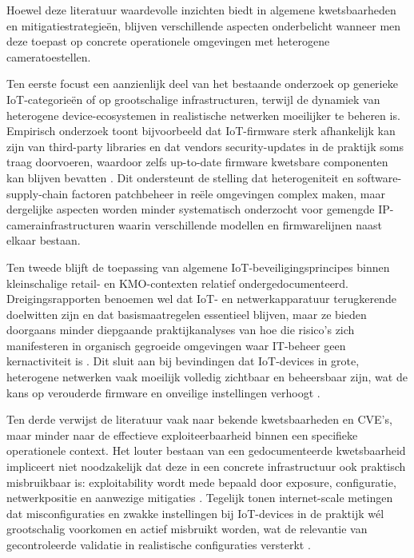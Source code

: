 Hoewel deze literatuur waardevolle inzichten biedt in algemene kwetsbaarheden en mitigatiestrategieën, blijven verschillende aspecten onderbelicht wanneer men deze toepast op concrete operationele omgevingen met heterogene cameratoestellen.

Ten eerste focust een aanzienlijk deel van het bestaande onderzoek op generieke IoT-categorieën of op grootschalige infrastructuren, terwijl de dynamiek van heterogene device-ecosystemen in realistische netwerken moeilijker te beheren is. Empirisch onderzoek toont bijvoorbeeld dat IoT-firmware sterk afhankelijk kan zijn van third-party libraries en dat vendors security-updates in de praktijk soms traag doorvoeren, waardoor zelfs up-to-date firmware kwetsbare componenten kan blijven bevatten \autocite{zhang2021capture}. Dit ondersteunt de stelling dat heterogeniteit en software-supply-chain factoren patchbeheer in reële omgevingen complex maken, maar dergelijke aspecten worden minder systematisch onderzocht voor gemengde IP-camerainfrastructuren waarin verschillende modellen en firmwarelijnen naast elkaar bestaan.

Ten tweede blijft de toepassing van algemene IoT-beveiligingsprincipes binnen kleinschalige retail- en KMO-contexten relatief ondergedocumenteerd. Dreigingsrapporten benoemen wel dat IoT- en netwerkapparatuur terugkerende doelwitten zijn en dat basismaatregelen essentieel blijven, maar ze bieden doorgaans minder diepgaande praktijkanalyses van hoe die risico’s zich manifesteren in organisch gegroeide omgevingen waar IT-beheer geen kernactiviteit is \autocite{ENISA2024ThreatLandscape}. Dit sluit aan bij bevindingen dat IoT-devices in grote, heterogene netwerken vaak moeilijk volledig zichtbaar en beheersbaar zijn, wat de kans op verouderde firmware en onveilige instellingen verhoogt \autocite{agarwal2019detecting}.

Ten derde verwijst de literatuur vaak naar bekende kwetsbaarheden en CVE’s, maar minder naar de effectieve exploiteerbaarheid binnen een specifieke operationele context. Het louter bestaan van een gedocumenteerde kwetsbaarheid impliceert niet noodzakelijk dat deze in een concrete infrastructuur ook praktisch misbruikbaar is: exploitability wordt mede bepaald door exposure, configuratie, netwerkpositie en aanwezige mitigaties \autocite{figueroa2020survey,baho2023analysis}. Tegelijk tonen internet-scale metingen dat misconfiguraties en zwakke instellingen bij IoT-devices in de praktijk wél grootschalig voorkomen en actief misbruikt worden, wat de relevantie van gecontroleerde validatie in realistische configuraties versterkt \autocite{srinivasa2021open}.

